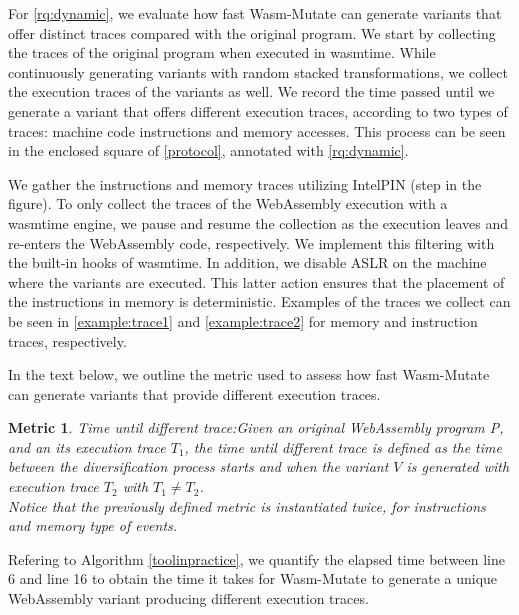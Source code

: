 \documentclass[a4paper,fleqn]{cas-dc}
\newcommand{\tool}{{\sc Wasm-Mutate}\xspace}
\newcommand{\Wasm}{WebAssembly\xspace}
\newcommand{\wasm}{\Wasm}
\newtheorem{metric}{Metric}
\newcommand*\step[1]{
\noindent\tikz[baseline=(char.base)]{
        \node[shape=circle,text=black,draw=black, fill=white,inner sep=1.2pt] (char) {#1};}}
\begin{document}
For \ref{rq:dynamic}, we evaluate how fast \tool can generate variants that offer distinct traces compared with the original program.
We start by collecting the traces of the original program when executed in wasmtime.
While continuously generating variants with random stacked transformations, we collect the execution traces of the variants as well.
We record the time passed until we generate a variant that offers different execution traces, according to two types of traces: machine code instructions and memory accesses.
This process can be seen in the enclosed square of \autoref{protocol}, annotated with \ref{rq:dynamic}.


We gather the instructions and memory traces utilizing IntelPIN \cite{luk2005pin, 10.1145/3478520} (step \step{4} in the figure).
To only collect the traces of the \Wasm execution with a wasmtime engine, we pause and resume the collection as the execution leaves and re-enters the \Wasm code, respectively.
We implement this filtering with the built-in hooks of wasmtime.
In addition, we disable ASLR on the machine where the variants are executed.
This latter action ensures that the placement of the instructions in memory is deterministic.
Examples of the traces we collect can be seen in \autoref{example:trace1} and \autoref{example:trace2} for memory and instruction traces, respectively.



In the text below, we outline the metric used to assess how fast \tool can generate variants that provide different execution traces.

\begin{metric}{Time until different trace:}\label{metric:mem:sha}
Given an original \wasm program P, and an its execution trace $T_1$, the time until different trace is defined as the time between the diversification process starts and when the variant $V$ is generated with execution trace $T_2$ with $T_1 \neq T_2$.
\\

Notice that the previously defined metric is instantiated twice, for instructions and memory type of events.

\end{metric}

Refering to Algorithm \ref{toolinpractice}, we quantify the elapsed time between line 6 and line 16 to obtain the time it takes for \tool to generate a unique \Wasm variant producing different execution traces.
\end{document}
